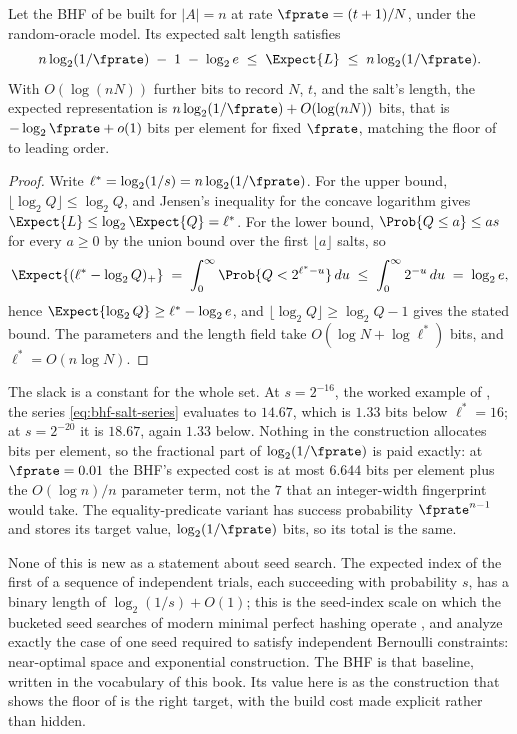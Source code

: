 \begin{theorem}
\label{thm:bhf-optimality}
Let the BHF of  be built for $|A| = n$ at rate $\fprate =
(t + 1)/N$, under the random-oracle model. Its expected salt length
satisfies
\[
  n \log_2(1/\fprate) \;-\; 1 \;-\; \log_2 e
  \;\le\; \Expect{L} \;\le\;
  n \log_2(1/\fprate).
\]
With $O(\log(nN))$ further bits to record $N$, $t$, and the salt's
length, the expected representation is $n \log_2(1/\fprate) +
O(\log(nN))$ bits, that is $-\log_2 \fprate + o(1)$ bits per element for
fixed $\fprate$, matching the floor of  to
leading order.
\end{theorem}

\begin{proof}
Write $\ell^{*} = \log_2(1/s) = n \log_2(1/\fprate)$. For the upper
bound, $\lfloor \log_2 Q \rfloor \le \log_2 Q$, and Jensen's inequality
for the concave logarithm gives
$\Expect{L} \le \log_2 \Expect{Q} = \ell^{*}$.
For the lower bound, $\Prob{Q \le a} \le a s$ for every $a \ge 0$ by the
union bound over the first $\lfloor a \rfloor$ salts, so
\[
  \Expect{(\ell^{*} - \log_2 Q)_{+}}
  \;=\; \int_0^{\infty} \Prob{Q < 2^{\ell^{*} - u}}\, du
  \;\le\; \int_0^{\infty} 2^{-u}\, du
  \;=\; \log_2 e,
\]
hence $\Expect{\log_2 Q} \ge \ell^{*} - \log_2 e$, and $\lfloor \log_2 Q
\rfloor \ge \log_2 Q - 1$ gives the stated bound. The parameters and the
length field take $O(\log N + \log \ell^{*})$ bits, and $\ell^{*} = O(n
\log N)$.
\end{proof}

The slack is a constant for the whole set. At $s = 2^{-16}$, the worked
example of , the series
\eqref{eq:bhf-salt-series} evaluates to $14.67$, which is $1.33$ bits
below $\ell^{*} = 16$; at $s = 2^{-20}$ it is $18.67$, again $1.33$
below. Nothing in the construction allocates bits per element, so the
fractional part of $\log_2(1/\fprate)$ is paid exactly: at $\fprate =
0.01$ the BHF's expected cost is at most $6.644$ bits per element plus the
$O(\log n)/n$ parameter term, not the $7$ that an integer-width
fingerprint would take. The equality-predicate variant
\parencite{towell-bernoulli-hash-function} has success probability
$\fprate^{n-1}$ and stores its target value, $\log_2(1/\fprate)$ bits, so
its total is the same.

None of this is new as a statement about seed search. The expected index
of the first of a sequence of independent trials, each succeeding with
probability $s$, has a binary length of $\log_2(1/s) + O(1)$; this is the
seed-index scale on which the bucketed seed searches of modern minimal
perfect hashing operate
\parencite{esposito-graf-vigna-2020,lehmann-sanders-walzer-2024}, and
\textcite[Sec.~1.1]{lehmann-et-al-2025} analyze exactly the case of one
seed required to satisfy independent Bernoulli constraints: near-optimal
space and exponential construction. The BHF is that baseline, written in
the vocabulary of this book. Its value here is as the construction that
shows the floor of  is the right target, with
the build cost made explicit rather than hidden.

